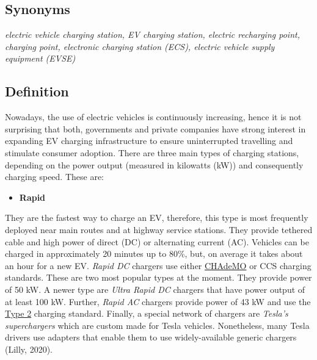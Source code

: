 \documentclass[
]{book}
\providecommand{\tightlist}{%
  \setlength{\itemsep}{0pt}\setlength{\parskip}{0pt}}
\begin{document}
\hypertarget{synonyms-4}{%
\subsection*{Synonyms}\label{synonyms-4}}

\emph{electric vehicle charging station, EV charging station, electric recharging point, charging point, electronic charging station (ECS), electric vehicle supply equipment (EVSE)}

\hypertarget{definition-5}{%
\subsection*{Definition}\label{definition-5}}

Nowadays, the use of electric vehicles is continuously increasing, hence it is not surprising that both, governments and private companies have strong interest in expanding EV charging infrastructure to ensure uninterrupted travelling and stimulate consumer adoption. There are three main types of charging stations, depending on the power output (measured in kilowatts (kW)) and consequently charging speed. These are:

\begin{itemize}
\tightlist
\item
  \textbf{Rapid}
\end{itemize}

They are the fastest way to charge an EV, therefore, this type is most frequently deployed near main routes and at highway service stations. They provide tethered cable and high power of direct (DC) or alternating current (AC). Vehicles can be charged in approximately 20 minutes up to 80\%, but, on average it takes about an hour for a new EV. \emph{Rapid DC} chargers use either \href{https://chademo.com/}{CHAdeMO} or CCS charging standards. These are two most popular types at the moment. They provide power of 50 kW. A newer type are \emph{Ultra Rapid DC} chargers that have power output of at least 100 kW. Further, \emph{Rapid AC} chargers provide power of 43 kW and use the \href{https://www.mobilityhouse.com/int_en/knowledge-center/charging-cable-and-plug-types\#:~:text=Type\%202\%20plug,-The\%20triple\%2Dphase\&text=In\%20private\%20spaces\%2C\%20charging\%20power,with\%20a\%20type\%202\%20socket.}{Type 2} charging standard. Finally, a special network of chargers are \emph{Tesla's superchargers} which are custom made for Tesla vehicles. Nonetheless, many Tesla drivers use adapters that enable them to use widely-available generic chargers (Lilly, 2020).
\end{document}
